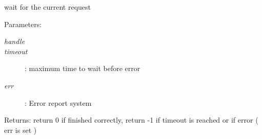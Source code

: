 wait for the current request 

\begin{Desc}
\item[Parameters:]
\begin{description}
\item[{\em handle}]\item[{\em timeout}]: maximum time to wait before error \item[{\em err}]: Error report system \end{description}
\end{Desc}
\begin{Desc}
\item[Returns:]return 0 if finished correctly, return -1 if timeout is reached or if error ( err is set ) \end{Desc}
